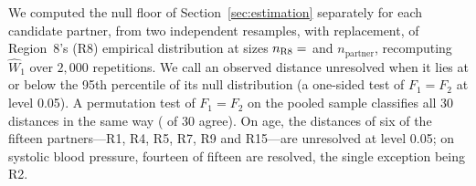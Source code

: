 \documentclass[AMA,Times1COL]{WileyNJDv5}
\begin{document}
We computed the null floor of Section~\ref{sec:estimation} separately for each candidate partner, from two independent resamples, with replacement, of Region~8's (R8) empirical distribution at sizes $n_{\text{R8}} = \numval{nR8floor}$ and $n_{\text{partner}}$, recomputing $\widehat{W}_1$ over $2{,}000$ repetitions. %
We call an observed distance unresolved when it lies at or below the 95th percentile of its null distribution (a one-sided test of $F_1 = F_2$ at level 0.05). A permutation test of $F_1 = F_2$ on the pooled sample classifies all 30 distances in the same way ( of 30 agree). On age, the distances of six of the fifteen partners---R1, R4, R5, R7, R9 and R15---are unresolved at level 0.05; on systolic blood pressure, fourteen of fifteen are resolved, the single exception being R2.

\end{document}
